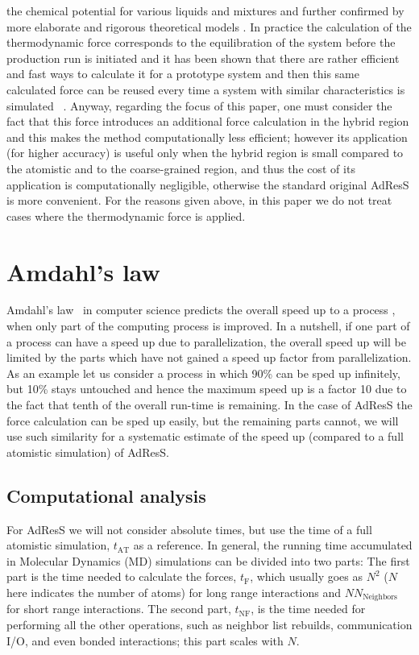 \documentclass[a4paper,preprint,unsortedaddress]{revtex4-1}
\begin{document}
the chemical potential for various liquids and mixtures and further confirmed by more elaborate and rigorous theoretical models \cite{njp}. In practice the calculation of the thermodynamic force corresponds to the equilibration of the system before the production run is initiated and it has been shown that there are rather efficient and fast ways to calculate it for a prototype system and then this same calculated force can be reused every time a system with similar characteristics is simulated ~\cite{jcp-anim,PI}. Anyway, regarding the focus of this paper, one must consider the fact that this force introduces an additional force calculation in the hybrid region and this makes the method computationally less efficient; however its application (for higher accuracy) is useful only when the hybrid region is small compared to the atomistic and to the coarse-grained region, and thus the cost of its application is computationally negligible, otherwise the standard original AdResS is more convenient.  For the reasons given above, in this paper we do not treat cases where the thermodynamic force is applied. 
\section{Amdahl's law}
Amdahl's law~\cite{amdahl} in computer science {predicts the overall speed up to a process , when only part of the computing process is improved.}
In a nutshell, if one part of a process can have a speed up due to parallelization, the overall speed up will be limited by the parts which have not gained a speed up factor from parallelization.
As an example let us consider a process in which 90\% can be sped up infinitely, but 10\% stays untouched and hence the maximum speed up is a factor 10 due to the fact that tenth of the overall run-time is remaining. In the case of AdResS the force calculation can be sped up easily, but the remaining parts cannot, we will use such similarity for a systematic estimate of the speed up (compared to a full atomistic simulation) of AdResS.

\subsection{Computational analysis}
For AdResS we will not consider absolute times, but use the time of a full atomistic simulation, $t_\text{AT}$ as a reference. In general, the running time accumulated in Molecular Dynamics (MD) simulations can be divided into two parts: 
The first part is the time needed to calculate the forces, $t_\text{F}$,
which usually goes as $N^2$ ($N$ here indicates the number of atoms) for long range interactions and $NN_\text{Neighbors}$ for short range interactions.
The second part, $t_\text{NF}$, is the time needed for performing all the other operations, such as neighbor list rebuilds, communication I/O, and even bonded interactions; this part scales with $N$.
\end{document}
